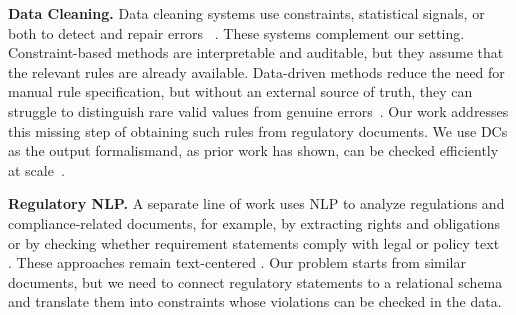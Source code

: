 \smallskip
\noindent\textbf{Data Cleaning.}
Data cleaning systems use constraints, statistical signals, or both to detect and repair errors~\cite{dataerrorsZiawash,chu2013holistic,holoclean,raha2019,peng2022garf,cleaningDeploy2024}\DIFaddbegin {}\cite{bao2024rock} \cite{ni2025zeroed,zhang2024cleaning}\DIFaddend . These systems complement our setting. Constraint-based methods are interpretable and auditable, but they assume that the relevant rules are already available. Data-driven methods reduce the need for manual rule specification, but without an external source of truth, they can struggle to distinguish rare valid values from genuine errors~\cite{cleaningDeploy2024}. Our work addresses this missing step of obtaining such rules from regulatory documents. We use DCs \DIFaddbegin {}\DIFaddend as the output formalism\DIFdelbegin {}\DIFdelend \DIFaddbegin {}\DIFaddend and, as prior work has shown, \DIFdelbegin {}\DIFdelend \DIFaddbegin {}\DIFaddend can be checked efficiently at scale\DIFdelbegin {}\DIFdelend ~\cite{facet2021,liu2024rapidash,youri2024}.

\smallskip
\noindent\textbf{Regulatory NLP.}
A separate line of work uses NLP to analyze regulations and compliance-related documents, for example, by extracting rights and obligations or by checking whether requirement statements comply with legal or policy text~\DIFdelbegin %
\DIFdelend \DIFaddbegin \cite{breaux2006regulatory,kiyavitskaya2008automating,amaral2023nlp,hassani2024rethinking,compliance2025ACMTSEM,masoudifard2024graphrag}\cite{guliani2026dejure,hettiarachchi-etal-2025-code,kabzhan2025semantic} \cite{li2025compliance2code}\cite{yu2026ruleworld,soni2026tam}\DIFaddend . These approaches remain \DIFdelbegin {}\DIFdelend text-centered \DIFdelbegin {}\DIFdelend \DIFaddbegin {}\DIFaddend . Our problem starts from similar documents, but we need to connect regulatory statements to a relational schema and translate them into constraints whose violations can be checked in the data.

